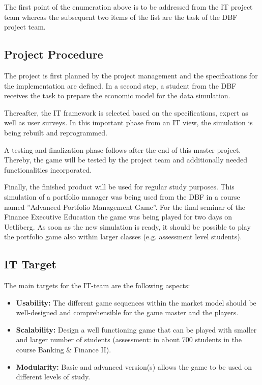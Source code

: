 The first point of the enumeration above is to be addressed from the IT project team whereas the subsequent two items of the list are the task of the DBF project team.


\subsection{Project Procedure}

The project is first planned by the project management and the specifications for the implementation are defined. In a second step, a student from the DBF receives the task to prepare the economic model for the data simulation.

Thereafter, the IT framework is selected based on the specifications, expert as well as user surveys. In this important phase from an IT view, the simulation is being rebuilt and reprogrammed.

A testing and finalization phase follows after the end of this master project. Thereby, the game will be tested by the project team and additionally needed functionalities incorporated.

Finally, the finished product will be used for regular study purposes. This simulation of a portfolio manager was being used from the DBF in a course named ''Advanced Portfolio Management Game''. For the final seminar of the Finance Executive Education the game was being played for two days on Uetliberg. As soon as the new simulation is ready, it should be possible to play the portfolio game also within larger classes (e.g. assessment level students).


\subsection{IT Target}
The main targets for the IT-team are the following aspects:
\begin{itemize}
  \item \textbf{Usability:} The different game sequences within the market model should be well-designed and comprehensible for the game master and the players.
  \item \textbf{Scalability:} Design a well functioning game that can be played with smaller and larger number of students (assessment: in about 700 students in the course Banking & Finance II).
  \item \textbf{Modularity:} Basic and advanced version(s) allows the game to be used on different levels of study.
\end{itemize}

